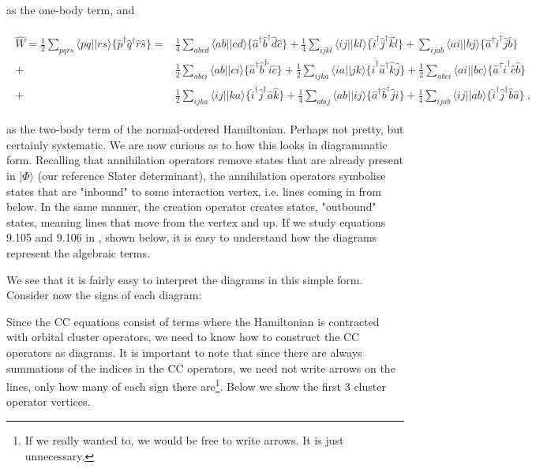 \documentclass[10pt,twoside]{report}
\begin{document}
	\noindent as the one-body term, and
	
	\begin{align}
		\begin{split}
		\hat{W} = \frac{1}{2}\sum_{pqrs}\langle pq||rs\rangle \{\hat{p}^\dagger\hat{q}^\dagger\hat{r}\hat{s}\} = &\frac{1}{4}\sum_{abcd}\langle ab||cd\rangle \{\hat{a}^\dagger\hat{b}^\dagger\hat{d}\hat{c}\} + \frac{1}{4}\sum_{ijkl}\langle ij||kl\rangle \{\hat{i}^\dagger\hat{j}^\dagger\hat{k}\hat{l}\} + \sum_{ijab}\langle ai||bj\rangle \{\hat{a}^\dagger\hat{i}^\dagger\hat{j}\hat{b}\} \\
		+&\frac{1}{2}\sum_{abci}\langle ab||ci\rangle \{\hat{a}^\dagger\hat{b}^\dagger\hat{i}\hat{c}\} + \frac{1}{2}\sum_{ijka}\langle ia||jk\rangle \{\hat{i}^\dagger\hat{a}^\dagger\hat{k}\hat{j}\} + \frac{1}{2}\sum_{abci}\langle ai||bc\rangle \{\hat{a}^\dagger\hat{i}^\dagger\hat{c}\hat{b}\} \\
		+&\frac{1}{2}\sum_{ijka}\langle ij||ka\rangle \{\hat{i}^\dagger\hat{j}^\dagger\hat{a}\hat{k}\} + \frac{1}{4}\sum_{abij}\langle ab||ij\rangle \{\hat{a}^\dagger\hat{b}^\dagger\hat{j}\hat{i}\} + \frac{1}{4}\sum_{ijab}\langle ij||ab\rangle \{\hat{i}^\dagger\hat{j}^\dagger\hat{b}\hat{a}\} \:,
		\end{split}
	\end{align}
	
	\noindent as the two-body term of the normal-ordered Hamiltonian. Perhaps not pretty, but certainly systematic. We are now curious as to how this looks in diagrammatic form. Recalling that annihilation operators remove states that are already present in $|\Phi\rangle$ (our reference Slater determinant), the annihilation operators symbolise states that are "inbound" to some interaction vertex, i.e. lines coming in from below. In the same manner, the creation operator creates states, "outbound" states, meaning lines that move from the vertex and up. If we study equations 9.105 and 9.106 in \cite{ShavittBartlett09}, shown below, it is easy to understand how the diagrams represent the algebraic terms.
	
	
	
	
	We see that it is fairly easy to interpret the diagrams in this simple form. Consider now the signs of each diagram:
	
	
	\newpage
	Since the CC equations consist of terms where the Hamiltonian is contracted with orbital cluster operators, we need to know how to construct the CC operators as diagrams. It is important to note that since there are always summations of the indices in the CC operators, we need not write arrows on the lines, only how many of each sign there are\footnote{If we really wanted to, we would be free to write arrows. It is just unnecessary.}. Below we show the first 3 cluster operator vertices.
	
\end{document}
